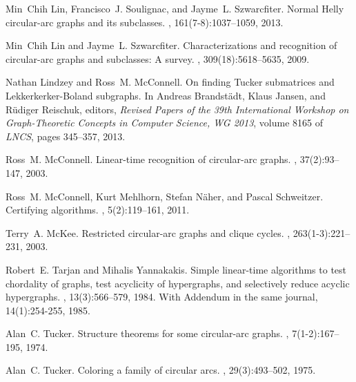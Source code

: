 \documentclass[10pt]{article}
\begin{document}
\begin{thebibliography}{10}
Min~Chih Lin, Francisco~J. Soulignac, and Jayme~L. Szwarcfiter.
\newblock Normal {H}elly circular-arc graphs and its subclasses.
, 161(7-8):1037--1059, 2013.

Min~Chih Lin and Jayme~L. Szwarcfiter.
\newblock Characterizations and recognition of circular-arc graphs and
  subclasses: A survey.
, 309(18):5618--5635, 2009.

Nathan Lindzey and Ross~M. McConnell.
\newblock On finding {Tucker} submatrices and {Lekkerkerker-Boland} subgraphs.
\newblock In Andreas Brandst\"{a}dt, Klaus Jansen, and R{\"u}diger Reischuk,
  editors, {\em Revised Papers of the 39th International Workshop on
  Graph-Theoretic Concepts in Computer Science, WG 2013}, volume 8165 of {\em
  LNCS}, pages 345--357, 2013.

Ross~M. McConnell.
\newblock Linear-time recognition of circular-arc graphs.
, 37(2):93--147, 2003.

Ross~M. McConnell, Kurt Mehlhorn, Stefan N{\"a}her, and Pascal Schweitzer.
\newblock Certifying algorithms.
, 5(2):119--161, 2011.

Terry~A. McKee.
\newblock Restricted circular-arc graphs and clique cycles.
, 263(1-3):221--231, 2003.

Robert~E. Tarjan and Mihalis Yannakakis.
\newblock Simple linear-time algorithms to test chordality of graphs, test
  acyclicity of hypergraphs, and selectively reduce acyclic hypergraphs.
, 13(3):566--579, 1984.
\newblock With Addendum in the same journal, 14(1):254-255, 1985.

Alan~C. Tucker.
\newblock Structure theorems for some circular-arc graphs.
, 7(1-2):167--195, 1974.

Alan~C. Tucker.
\newblock Coloring a family of circular arcs.
, 29(3):493--502, 1975.

\end{thebibliography}
\end{document}
